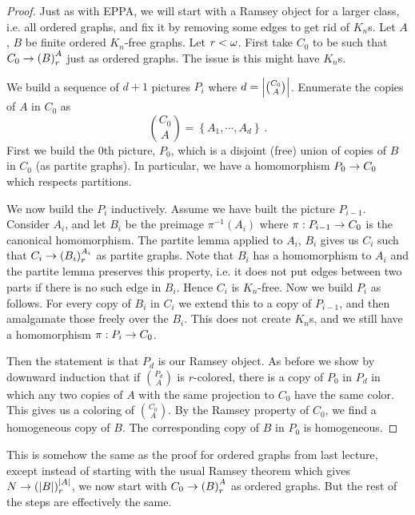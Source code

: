 \documentclass{amsart}
\begin{document}
\begin{proof}
Just as with EPPA, we will start with a Ramsey object for a larger class, i.e. all ordered
graphs, and fix it by removing some edges to get rid of $K_n$s.
Let $A$, $B$ be finite ordered $K_n$-free graphs. Let $r<\omega$.
First take $C_0$ to be such that $C_0\rightarrow \left( B \right)_r^A$ just as ordered graphs. 
The issue is this might have $K_n$s.

We build a sequence of $d+1$ pictures $P_i$ where $d = \left| \binom{C_0}{A} \right|$.
Enumerate the copies of $A$ in $C_0$ as
\begin{equation}
\binom{C_0}{A} = \left\{ A_1 , \cdots , A_d \right\} \ .
\end{equation}
First we build the $0$th picture, $P_0$, which is a disjoint (free) union of copies of $B$
in $C_0$ (as partite graphs).
In particular, we have a homomorphism $P_0\rightarrow C_0$ which respects partitions.

We now build the $P_i$ inductively. Assume we have built the picture $P_{i-1}$. 
Consider $A_i$, and let $B_i$ be the preimage $\pi^{-1}\left( A_i \right)$ where 
$\pi: P_{i-1}\rightarrow C_0$ is the canonical homomorphism.
The partite lemma applied to $A_i$, $B_i$ gives us $C_i$ such that 
$C_i \rightarrow \left( B_i \right)_r^{A_i}$ as partite graphs.
Note that $B_i$ has a homomorphism to $A_i$ and the partite lemma preserves this property, 
i.e. it does not put edges between two parts if there is no such edge in $B_i$.
Hence $C_i$ is $K_n$-free.
Now we build $P_i$ as follows. For every copy of $B_i$ in $C_i$
we extend this to a copy of $P_{i-1}$, and then amalgamate those freely over the $B_i$.
This does not create $K_n$s, and we still have a homomorphism $\pi: P_i \rightarrow C_0$.

Then the statement is that $P_d$ is our Ramsey object. As before we show by downward induction that if
$\binom{P_d}{A}$ is $r$-colored, there is a copy of $P_0$ in $P_d$ in which any two copies
of $A$ with the same projection to $C_0$ have the same color.
This gives us a coloring of $\binom{C_0}{A}$. By the Ramsey property of $C_0$, we find a
homogeneous copy of $B$. The corresponding copy of $B$ in $P_0$ is homogeneous.
\end{proof}

\begin{rmk}
This is somehow the same as the proof for ordered graphs from last lecture, except instead 
of starting with
the usual Ramsey theorem which gives $N\rightarrow \left( \left| B \right| \right)^{\left| A \right|}_r$, we
now start with $C_0\rightarrow \left( B \right)^A_r$ as ordered graphs.
But the rest of the steps are effectively the same.
\end{rmk}
\end{document}
